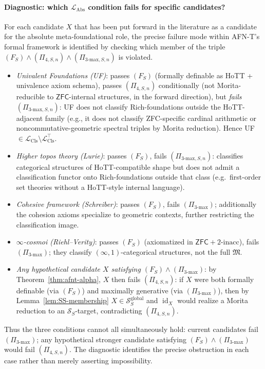\documentclass[11pt]{article}
\theoremstyle{plain}
\theoremstyle{definition}
\newcommand{\cS}{\mathcal{S}}
\newcommand{\fM}{\mathfrak{M}}
\newcommand{\LCls}{\mathcal{L}_{\mathrm{Cls}}}
\newcommand{\LClsMax}{\mathcal{L}_{\mathrm{Cls}}^{\top}}
\newcommand{\LAbs}{\mathcal{L}_{\mathrm{Abs}}}
\newcommand{\ZFC}{\mathsf{ZFC}}
\DeclareMathOperator{\id}{id}
\begin{document}
\paragraph{Diagnostic: which $\LAbs$ condition fails for specific candidates?} For each candidate $X$ that has been put forward in the literature as a candidate for the absolute meta-foundational role, the precise failure mode within AFN-T's formal framework is identified by checking which member of the triple $(F_S) \wedge (\Pi_{4, S, n}) \wedge (\Pi_{3\text{-max}, S, n})$ is violated.
\begin{itemize}\setlength{\itemsep}{1pt}
\item \emph{Univalent Foundations (UF)}: passes $(F_S)$ (formally definable as HoTT + univalence axiom schema), passes $(\Pi_{4, S, n})$ conditionally (not Morita-reducible to $\ZFC$-internal structures, in the forward direction), but \emph{fails $(\Pi_{3\text{-max}, S, n})$}: UF does not classify Rich-foundations outside the HoTT-adjacent family (e.g., it does not classify ZFC-specific cardinal arithmetic or noncommutative-geometric spectral triples by Morita reduction). Hence UF $\in \LCls \setminus \LClsMax$.
\item \emph{Higher topos theory (Lurie)}: passes $(F_S)$, fails $(\Pi_{3\text{-max}, S, n})$: classifies categorical structures of HoTT-compatible shape but does not admit a classification functor onto Rich-foundations outside that class (e.g.\ first-order set theories without a HoTT-style internal language).
\item \emph{Cohesive framework (Schreiber)}: passes $(F_S)$, fails $(\Pi_{3\text{-max}})$; additionally the cohesion axioms specialize to geometric contexts, further restricting the classification image.
\item \emph{$\infty$-cosmoi (Riehl--Verity)}: passes $(F_S)$ (axiomatized in $\ZFC + 2\text{-inacc}$), fails $(\Pi_{3\text{-max}})$; they classify $(\infty, 1)$-categorical structures, not the full $\fM$.
\item \emph{Any hypothetical candidate $X$ satisfying $(F_S) \wedge (\Pi_{3\text{-max}})$}: by Theorem~\ref{thm:afnt-alpha}, $X$ then fails $(\Pi_{4, S, n})$: if $X$ were both formally definable (via $(F_S)$) and maximally generative (via $(\Pi_{3\text{-max}})$), then by Lemma~\ref{lem:SS-membership} $X \in \cS_S^{\mathrm{global}}$ and $\id_X$ would realize a Morita reduction to an $\cS_S$-target, contradicting $(\Pi_{4, S, n})$.
\end{itemize}
Thus the three conditions cannot all simultaneously hold: current candidates fail $(\Pi_{3\text{-max}})$; any hypothetical stronger candidate satisfying $(F_S) \wedge (\Pi_{3\text{-max}})$ would fail $(\Pi_{4, S, n})$. The diagnostic identifies the precise obstruction in each case rather than merely asserting impossibility.
\end{document}
